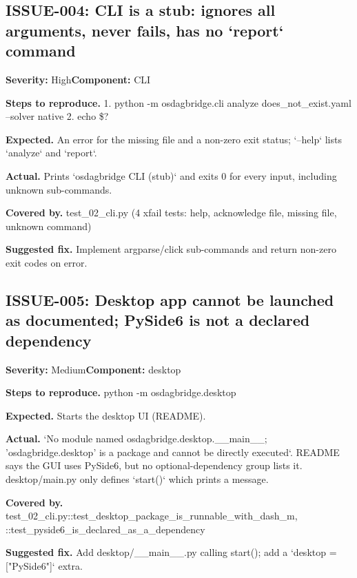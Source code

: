 \subsection*{ISSUE-004: CLI is a stub: ignores all arguments, never fails, has no `report` command}
\textbf{Severity:} High\quad \textbf{Component:} CLI\par
\textbf{Steps to reproduce.} 1.\allowbreak{} python -m osdagbridge.\allowbreak{}cli analyze does\_\allowbreak{}not\_\allowbreak{}exist.\allowbreak{}yaml --solver native 2.\allowbreak{} echo \$?\par
\textbf{Expected.} An error for the missing file and a non-zero exit status; `--help` lists `analyze` and `report`.\allowbreak{}\par
\textbf{Actual.} Prints `osdagbridge CLI (stub)` and exits 0 for every input, including unknown sub-commands.\allowbreak{}\par
\textbf{Covered by.} test\_\allowbreak{}02\_\allowbreak{}cli.\allowbreak{}py (4 xfail tests: help, acknowledge file, missing file, unknown command)\par
\textbf{Suggested fix.} Implement argparse/\allowbreak{}click sub-commands and return non-zero exit codes on error.\allowbreak{}

\subsection*{ISSUE-005: Desktop app cannot be launched as documented; PySide6 is not a declared dependency}
\textbf{Severity:} Medium\quad \textbf{Component:} desktop\par
\textbf{Steps to reproduce.} python -m osdagbridge.\allowbreak{}desktop\par
\textbf{Expected.} Starts the desktop UI (README).\allowbreak{}\par
\textbf{Actual.} `No module named osdagbridge.\allowbreak{}desktop.\allowbreak{}\_\allowbreak{}\_\allowbreak{}main\_\allowbreak{}\_\allowbreak{}; 'osdagbridge.\allowbreak{}desktop' is a package and cannot be directly executed`.\allowbreak{} README says the GUI uses PySide6, but no optional-dependency group lists it.\allowbreak{} desktop/\allowbreak{}main.\allowbreak{}py only defines `start()` which prints a message.\allowbreak{}\par
\textbf{Covered by.} test\_\allowbreak{}02\_\allowbreak{}cli.\allowbreak{}py::\allowbreak{}test\_\allowbreak{}desktop\_\allowbreak{}package\_\allowbreak{}is\_\allowbreak{}runnable\_\allowbreak{}with\_\allowbreak{}dash\_\allowbreak{}m, ::\allowbreak{}test\_\allowbreak{}pyside6\_\allowbreak{}is\_\allowbreak{}declared\_\allowbreak{}as\_\allowbreak{}a\_\allowbreak{}dependency\par
\textbf{Suggested fix.} Add desktop/\allowbreak{}\_\allowbreak{}\_\allowbreak{}main\_\allowbreak{}\_\allowbreak{}.\allowbreak{}py calling start(); add a `desktop = ["PySide6"]` extra.\allowbreak{}

